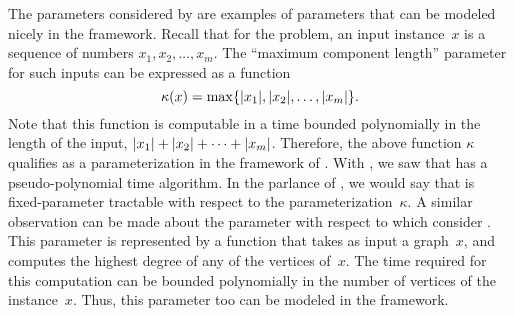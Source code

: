 The parameters considered by \citeauthor{garey1979computers} are examples of parameters that can be modeled nicely in the \citeauthor{flum2006parameterized} framework.
Recall that for the  problem, an input instance~$x$ is a sequence of numbers $x_1, x_2, \ldots, x_m$.
The \enquote{maximum component length} parameter for such inputs can be expressed as a function
\begin{equation*}
  \kappa(x) = \max \{{\lvert x_1\rvert}, {\lvert x_2\rvert}, \ldots, {\lvert x_m\rvert}\}.
\end{equation*}
Note that this function is computable in a time bounded polynomially in the length of the input, ${\lvert x_1\rvert} + {\lvert x_2\rvert} + \cdots + {\lvert x_m\rvert}$.
Therefore, the above function $\kappa$ qualifies as a parameterization in the framework of \citeauthor{flum2006parameterized}.
With \citeauthor{garey1979computers}, we saw that  has a pseudo-polynomial time algorithm.
In the parlance of \citeauthor{flum2006parameterized}, we would say that  is fixed-parameter tractable with respect to the parameterization~$\kappa$.
A similar observation can be made about the parameter with respect to which \citeauthor{garey1979computers} consider .
This parameter is represented by a function that takes as input a graph~$x$, and computes the highest degree of any of the vertices of~$x$.
The time required for this computation can be bounded polynomially in the number of vertices of the instance~$x$.
Thus, this parameter too can be modeled in the \citeauthor{flum2006parameterized} framework.

